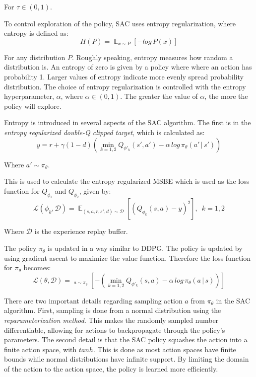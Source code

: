 \documentclass[conference]{IEEEtran}
\begin{document}
\begin{flushleft}
    For $\tau \in (0, 1)$.
\end{flushleft}

To control exploration of the policy, SAC uses entropy regularization, where entropy is defined as:
$$
    H(P) = \mathop{\mathbb{E}}_{x \sim P} \left[- log \, P(x)\right]
$$
\begin{flushleft}
    For any distribution $P$. Roughly speaking, entropy measures how random a distribution is. An entropy of zero is given by a policy where where an action has probability 1. Larger values of entropy indicate more evenly spread probability distribution. The choice of entropy regularization is controlled with the entropy hyperparameter, $\alpha$, where $\alpha \in (0, 1)$. The greater the value of $\alpha$, the more the policy will explore.
\end{flushleft}

Entropy is introduced in several aspects of the SAC algorithm. The first is in the \textit{entropy regularized double-Q clipped target}, which is calculated as:
$$
    y = r + \gamma(1-d)\left(\mathop{min}_{k=1,2}Q_{\phi'_k}(s', a') - \alpha \, log \, \pi_\theta(a' \, | \, s')\right)
$$

\begin{flushleft}
    Where $a' \sim \pi_\theta$.
\end{flushleft}

This is used to calculate the entropy regularized MSBE which is used as the loss function for $Q_{\phi_1}$ and $Q_{\phi_2}$, given by:
$$
    \mathcal{L}(\phi_k, \mathcal{D}) = \mathop{\mathbb{E}}_{(s,a,r,s',d) \sim \mathcal{D}}\left[\left(Q_{\phi_k}(s,a) - y\right)^2\right], \enspace k=1,2
$$
\begin{flushleft}
    Where $\mathcal{D}$ is the experience replay buffer.
\end{flushleft}

The policy $\pi_\theta$ is updated in a way similar to DDPG. The policy is updated by using gradient ascent to maximize the value function. Therefore the loss function for $\pi_\theta$ becomes:
$$
    \mathcal{L}(\theta, \mathcal{D}) = \mathop{\mathop{\mathbb{E}}_{s \sim \mathcal{D}}}_{a \sim \pi_\theta} \left[-\left(\mathop{min}_{k=1,2} Q_{\phi'_k}(s, a) - \alpha \, log \, \pi_\theta(a \, | \, s)\right)\right]
$$

There are two important details regarding sampling action $a$ from $\pi_\theta$ in the SAC algorithm. First, sampling is done from a normal distribution using the \textit{reparameterization method}. This makes the randomly sampled number differentiable, allowing for actions to backpropagate through the policy's parameters. The second detail is that the SAC policy squashes the action into a finite action space, with $tanh$. This is done as most action spaces have finite bounds while normal distributions have infinite support. By limiting the domain of the action to the action space, the policy is learned more efficiently.
\end{document}
